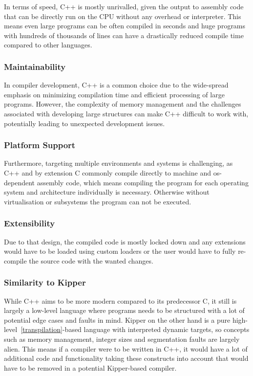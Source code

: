 In terms of speed, C++ is mostly unrivalled, given the output to assembly code that can be directly run on the CPU without any overhead or interpreter. This means even large programs can be often compiled in seconds and huge programs with hundreds of thousands of lines can have a drastically reduced compile time compared to other languages.

\subsubsection{Maintainability}

In compiler development, C++ is a common choice due to the wide-spread emphasis on minimizing compilation time and efficient processing of large programs. However, the complexity of memory management and the challenges associated with developing large structures can make C++ difficult to work with, potentially leading to unexpected development issues.

\subsubsection{Platform Support}

Furthermore, targeting multiple environments and systems is challenging, as C++ and by extension C commonly compile directly to machine and os-dependent assembly code, which means compiling the program for each operating system and architecture individually is necessary. Otherwise without virtualisation or subsystems the program can not be executed.

\subsubsection{Extensibility}

Due to that design, the compiled code is mostly locked down and any extensions would have to be loaded using custom loaders or the user would have to fully re-compile the source code with the wanted changes.

\subsubsection{Similarity to Kipper}

While C++ aims to be more modern compared to its predecessor C, it still is largely a low-level language where programs needs to be structured with a lot of potential edge cases and faults in mind. Kipper on the other hand is a pure high-level~\ref{transpilation}-based language with interpreted dynamic targets, so concepts such as memory management, integer sizes and segmentation faults are largely alien. This means if a compiler were to be written in C++, it would have a lot of additional code and functionality taking these constructs into account that would have to be removed in a potential Kipper-based compiler.

